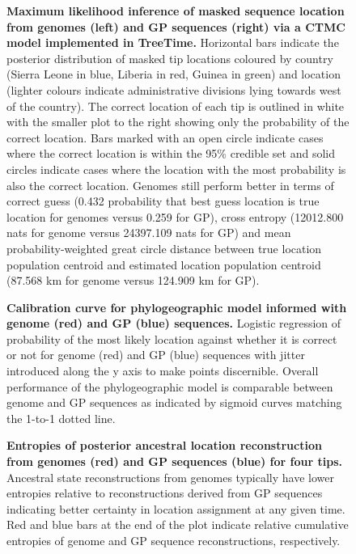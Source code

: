 \documentclass{bmcart}
\def\texttt{[image: ]}
\begin{document}
\begin{figure}[h]
 \centering
	\caption{\textbf{Maximum likelihood inference of masked sequence location from genomes (left) and GP sequences (right) via a CTMC model implemented in TreeTime.}
  Horizontal bars indicate the posterior distribution of masked tip locations coloured by country (Sierra Leone in blue, Liberia in red, Guinea in green) and location (lighter colours indicate administrative divisions lying towards west of the country).
  The correct location of each tip is outlined in white with the smaller plot to the right showing only the probability of the correct location.
  Bars marked with an open circle indicate cases where the correct location is within the 95\% credible set and solid circles indicate cases where the location with the most probability is also the correct location.
  Genomes still perform better in terms of correct guess (0.432 probability that best guess location is true location for genomes versus 0.259 for GP), cross entropy (12012.800 nats for genome versus 24397.109 nats for GP) and mean probability-weighted great circle distance between true location population centroid and estimated location population centroid (87.568 km for genome versus 124.909 km for GP).
	}
	\label{TTlocations}
\end{figure}

\begin{figure}[h]
 \centering
	\caption{\textbf{Calibration curve for phylogeographic model informed with genome (red) and GP (blue) sequences.}
  Logistic regression of probability of the most likely location against whether it is correct or not for genome (red) and GP (blue) sequences with jitter introduced along the y axis to make points discernible.
  Overall performance of the phylogeographic model is comparable between genome and GP sequences as indicated by sigmoid curves matching the 1-to-1 dotted line.
	}
	\label{calibration}
\end{figure}

\begin{figure}[h]
 \centering
  \caption{\textbf{Entropies of posterior ancestral location reconstruction from genomes (red) and GP sequences (blue) for four tips.}
  Ancestral state reconstructions from genomes typically have lower entropies relative to reconstructions derived from GP sequences indicating better certainty in location assignment at any given time.
  Red and blue bars at the end of the plot indicate relative cumulative entropies of genome and GP sequence reconstructions, respectively.
  }
	\label{trace_entropy}
\end{figure}
\end{document}
